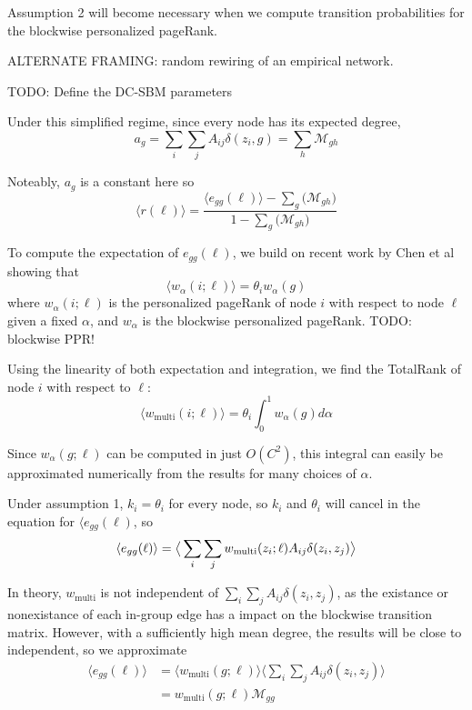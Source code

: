 \documentclass[12pt]{article}
\begin{document}
Assumption 2 will become necessary when we compute transition probabilities for the blockwise personalized pageRank. 

ALTERNATE FRAMING: random rewiring of an empirical network.

TODO: Define the DC-SBM parameters

Under this simplified regime, since every node has its expected degree,
\begin{equation}
  a_g = \sum_i \sum_j A_{ij} \delta(z_i, g) = \sum_h \mathcal{M}_{gh}
\end{equation}

Noteably, $a_g$ is a constant here so 
\begin{equation}
  \langle r(\ell) \rangle = \frac{\langle e_{gg}(\ell) \rangle - \sum_g \big( \mathcal{M}_{gh} \big)}{1 - \sum_g \big( \mathcal{M}_{gh} \big)}
\end{equation}

To compute the expectation of $e_{gg}(\ell)$, we build on recent work by Chen et al \cite{chen:2020} showing that
\begin{equation}
  \langle w_\alpha (i ; \ell) \rangle = \theta_i w_\alpha(g)
\end{equation}
where $w_\alpha(i;\ell)$ is the personalized pageRank of node $i$ with respect to node $\ell$ given a fixed $\alpha$, and $w_\alpha$ is the blockwise personalized pageRank.
TODO: blockwise PPR! 

Using the linearity of both expectation and integration, we find the TotalRank \cite{boldi:2005} \cite{Peel:2018} of node $i$ with respect to $\ell$:
\begin{equation}
  \langle w_\text{multi} (i ; \ell) \rangle = \theta_i \int_0^1 w_\alpha(g) d\alpha
\end{equation}

Since $w_\alpha (g;\ell)$ can be computed in just $O(C^2)$, this integral can easily be approximated numerically from the results for many choices of $\alpha$.

Under assumption 1, $k_i = \theta_i$ for every node, so $k_i$ and $\theta_i$ will cancel in the equation for $\langle e_{gg} (\ell)$, so
\begin{equation}
    \langle e_{gg}(\ell) \rangle = \big \langle \sum_i \sum_j w_\text{multi}(z_i; \ell) A_{ij} \delta(z_i, z_j) \big \rangle\\
\end{equation}

In theory, $w_\text{multi}$ is not independent of $\sum_i \sum_j A_{ij} \delta(z_i, z_j)$, as the existance or nonexistance of each in-group edge has a impact on the blockwise transition matrix.  However, with a sufficiently high mean degree, the results will be close to independent, so we approximate
\begin{equation}
  \begin{aligned}
    \langle e_{gg}(\ell) \rangle &= \big \langle w_\text{multi}(g; \ell) \big \rangle \big \langle \sum_i \sum_j A_{ij} \delta(z_i, z_j) \big \rangle \\
    &= w_\text{multi}(g; \ell) \mathcal{M}_{gg}
  \end{aligned}
\end{equation}
\end{document}
